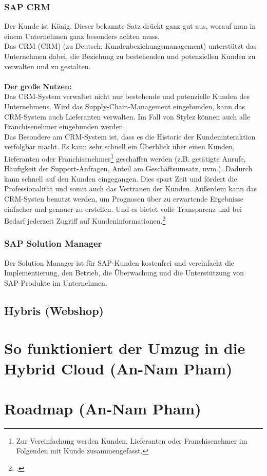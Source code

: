 \subsubsection{SAP CRM}
\glqq Der Kunde ist König\grqq. Dieser bekannte Satz drückt ganz gut aus, worauf man in einem Unternehmen ganz besonders achten muss.\\
Das \acrlong{CRM} (CRM) (zu Deutsch: Kundenbeziehungsmanagement) unterstützt das Unternehmen dabei, die Beziehung zu bestehenden und potenziellen Kunden zu verwalten und zu gestalten.\\
\\
\underline{\textbf{Der große Nutzen:}}\\
Das CRM-System verwaltet nicht nur bestehende und potenzielle Kunden des Unternehmens. Wird das Supply-Chain-Management eingebunden, kann das CRM-System auch Lieferanten verwalten. Im Fall von Stylez können auch alle Franchisenehmer eingebunden werden.\\
Das Besondere am CRM-System ist, dass es die Historie der Kundeninteraktion verfolgbar macht. Es kann sehr schnell ein Überblick über einen Kunden, Lieferanten oder Franchisenehmer\footnote{Zur Vereinfachung werden Kunden, Lieferanten oder Franchisenehmer im Folgenden mit Kunde zusammengefasst.} geschaffen werden (z.B. getätigte Anrufe, Häufigkeit der Support-Anfragen, Anteil am Geschäftsumsatz, uvm.).
Dadurch kann schnell auf den Kunden eingegangen. Dies spart Zeit und fördert die Professionalität und somit auch das Vertrauen der Kunden. Außerdem kann das CRM-Systen benutzt werden, um Prognosen über zu erwartende Ergebnisse einfacher und genauer zu erstellen. Und es bietet volle Transparenz und bei Bedarf jederzeit Zugriff auf Kundeninformationen.\footcite{CRM}

\subsubsection{SAP Solution Manager}
Der Solution Manager ist für SAP-Kunden kostenfrei und vereinfacht die Implementierung, den Betrieb, die Überwachung und die Unterstützung von SAP-Produkte im Unternehmen.

\subsection{Hybris (Webshop)}
\section{So funktioniert der Umzug in die Hybrid Cloud (An-Nam Pham)}
\section{Roadmap (An-Nam Pham)}
